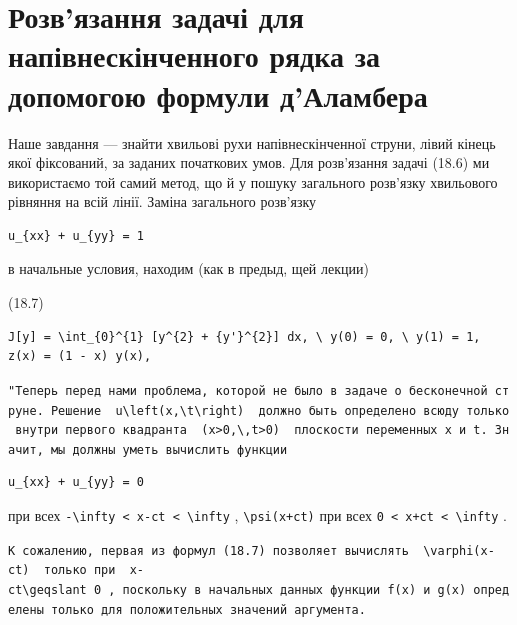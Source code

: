 \documentclass[
  ukrainian,
]{article}
\begin{document}
\section{Розв'язання задачі для напівнескінченного рядка за допомогою
формули
д'Аламбера}\label{ux440ux43eux437ux432ux44fux437ux430ux43dux43dux44f-ux437ux430ux434ux430ux447ux456-ux434ux43bux44f-ux43dux430ux43fux456ux432ux43dux435ux441ux43aux456ux43dux447ux435ux43dux43dux43eux433ux43e-ux440ux44fux434ux43aux430-ux437ux430-ux434ux43eux43fux43eux43cux43eux433ux43eux44e-ux444ux43eux440ux43cux443ux43bux438-ux434ux430ux43bux430ux43cux431ux435ux440ux430}

Наше завдання --- знайти хвильові рухи напівнескінченної струни, лівий
кінець якої фіксований, за заданих початкових умов. Для розв'язання
задачі (18.6) ми використаємо той самий метод, що й у пошуку загального
розв'язку хвильового рівняння на всій лінії. Заміна загального розв'язку

\begin{verbatim}
u_{xx} + u_{yy} = 1
\end{verbatim}

в начальные условия, находим (как в предыд, щей лекции)

(18.7)

\begin{verbatim}
J[y] = \int_{0}^{1} [y^{2} + {y'}^{2}] dx, \ y(0) = 0, \ y(1) = 1,
z(x) = (1 - x) y(x),
\end{verbatim}

\texttt{"Теперь\ перед\ нами\ проблема,\ которой\ не\ было\ в\ задаче\ о\ бесконечной\ струне.\ Решение\ \ \textquotesingle{}u\textbackslash{}left(x,\textbackslash{}t\textbackslash{}right)\textquotesingle{}\ \ должно\ быть\ определено\ всюду\ только\ внутри\ первого\ квадранта\ \ \textquotesingle{}(x\textgreater{}0,\textbackslash{},t\textgreater{}0)\textquotesingle{}\ \ плоскости\ переменных\ x\ и\ t.\ Значит,\ мы\ должны\ уметь\ вычислить\ функции}

\begin{verbatim}
u_{xx} + u_{yy} = 0
\end{verbatim}

при всех
\texttt{-\textbackslash{}infty\ \textless{}\ x-ct\ \textless{}\ \textbackslash{}infty}
, \texttt{\textbackslash{}psi(x+ct)} при всех
\texttt{0\ \textless{}\ x+ct\ \textless{}\ \textbackslash{}infty} .

\texttt{К\ сожалению,\ первая\ из\ формул\ (18.7)\ позволяет\ вычислять\ \ \textquotesingle{}\textbackslash{}varphi(x-ct)\textquotesingle{}\ \ только\ при\ \ \textquotesingle{}x-ct\textbackslash{}geqslant\ 0\textquotesingle{}\ ,\ поскольку\ в\ начальных\ данных\ функции\ \textquotesingle{}f(x)\textquotesingle{}\ и\ \textquotesingle{}g(x)\textquotesingle{}\ определены\ только\ для\ положительных\ значений\ аргумента.}
\end{document}
